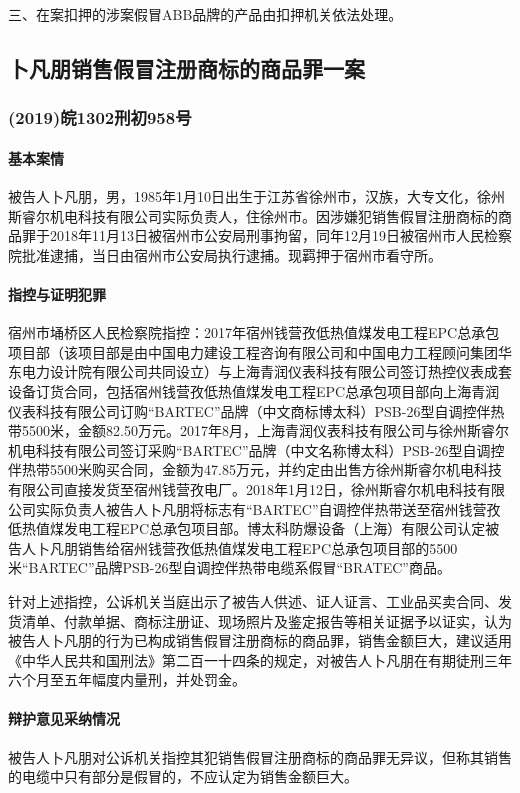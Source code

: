\documentclass[
    a4paper
    ]{ctexart}
\begin{document}
{\begin{sloppy}
三、在案扣押的涉案假冒ABB品牌的产品由扣押机关依法处理。



\subsection{卜凡朋销售假冒注册商标的商品罪一案}
\subsubsection*{(2019)皖1302刑初958号}
\paragraph{基本案情}
被告人卜凡朋，男，1985年1月10日出生于江苏省徐州市，汉族，大专文化，徐州斯睿尔机电科技有限公司实际负责人，住徐州市。因涉嫌犯销售假冒注册商标的商品罪于2018年11月13日被宿州市公安局刑事拘留，同年12月19日被宿州市人民检察院批准逮捕，当日由宿州市公安局执行逮捕。现羁押于宿州市看守所。

\paragraph{指控与证明犯罪}
宿州市埇桥区人民检察院指控：2017年宿州钱营孜低热值煤发电工程EPC总承包项目部（该项目部是由中国电力建设工程咨询有限公司和中国电力工程顾问集团华东电力设计院有限公司共同设立）与上海青润仪表科技有限公司签订热控仪表成套设备订货合同，包括宿州钱营孜低热值煤发电工程EPC总承包项目部向上海青润仪表科技有限公司订购“BARTEC”品牌（中文商标博太科）PSB-26型自调控伴热带5500米，金额82.50万元。2017年8月，上海青润仪表科技有限公司与徐州斯睿尔机电科技有限公司签订采购“BARTEC”品牌（中文名称博太科）PSB-26型自调控伴热带5500米购买合同，金额为47.85万元，并约定由出售方徐州斯睿尔机电科技有限公司直接发货至宿州钱营孜电厂。2018年1月12日，徐州斯睿尔机电科技有限公司实际负责人被告人卜凡朋将标志有“BARTEC”自调控伴热带送至宿州钱营孜低热值煤发电工程EPC总承包项目部。博太科防爆设备（上海）有限公司认定被告人卜凡朋销售给宿州钱营孜低热值煤发电工程EPC总承包项目部的5500米“BARTEC”品牌PSB-26型自调控伴热带电缆系假冒“BRATEC”商品。

针对上述指控，公诉机关当庭出示了被告人供述、证人证言、工业品买卖合同、发货清单、付款单据、商标注册证、现场照片及鉴定报告等相关证据予以证实，认为被告人卜凡朋的行为已构成销售假冒注册商标的商品罪，销售金额巨大，建议适用《中华人民共和国刑法》第二百一十四条的规定，对被告人卜凡朋在有期徒刑三年六个月至五年幅度内量刑，并处罚金。



\paragraph{辩护意见采纳情况}
被告人卜凡朋对公诉机关指控其犯销售假冒注册商标的商品罪无异议，但称其销售的电缆中只有部分是假冒的，不应认定为销售金额巨大。


\end{sloppy}}
\end{document}
